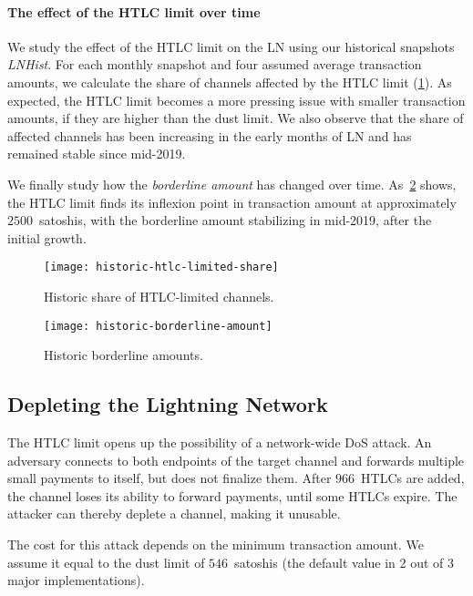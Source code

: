 \paragraph{The effect of the HTLC limit over time}

We study the effect of the HTLC limit on the LN using our historical snapshots \emph{LNHist}.
For each monthly snapshot and four assumed average transaction amounts, we calculate the share of channels affected by the HTLC limit (\cref{fig:historic-htlc-limited-share}).
As expected, the HTLC limit becomes a more pressing issue with smaller transaction amounts, if they are higher than the dust limit.
We also observe that the share of affected channels has been increasing in the early months of LN and has remained stable since mid-2019.

We finally study how the \textit{borderline amount} has changed over time.
As~\cref{fig:historic-borderline-amount} shows, the HTLC limit finds its inflexion point in transaction amount at approximately $2500$~satoshis, with the borderline amount stabilizing in mid-2019, after the initial growth.

\begin{figure}[tb]
	\centering
	\texttt{[image: historic-htlc-limited-share]}
	\caption{Historic share of HTLC-limited channels.\label{fig:historic-htlc-limited-share}}
\end{figure}

\begin{figure}[tb]
	\centering
	\texttt{[image: historic-borderline-amount]}
	\caption{Historic borderline amounts.\label{fig:historic-borderline-amount}}
\end{figure}


\subsection{Depleting the Lightning Network}

The HTLC limit opens up the possibility of a network-wide DoS attack.
An adversary connects to both endpoints of the target channel and forwards multiple small payments to itself, but does not finalize them.
After $966$~HTLCs are added, the channel loses its ability to forward payments, until some HTLCs expire.
The attacker can thereby deplete a channel, making it unusable.

The cost for this attack depends on the minimum transaction amount.
We assume it equal to the dust limit of $546$~satoshis (the default value in 2 out of 3 major implementations).

